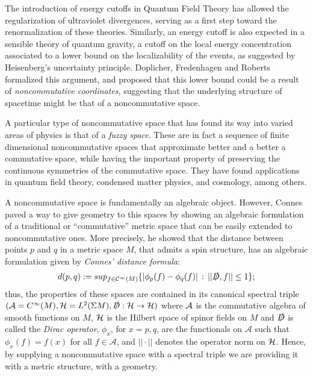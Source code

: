The introduction of energy cutoffs in Quantum Field Theory has allowed the regularization of ultraviolet divergences, serving as a first step toward the renormalization of these theories. Similarly, an energy cutoff is also expected in a sensible theory of quantum gravity, a cutoff on the local energy concentration associated to a lower bound on the localizability of the events, as suggested by Heisenberg's uncertainty principle. Doplicher, Fredenhagen and Roberts \cite{DFR} formalized this argument, and proposed that this lower bound could be a result of \textit{noncommutative coordinates}, suggesting that the underlying structure of spacetime might be that of a noncommutative space.

A particular type of noncommutative space that has found its way into varied areas of physics is that of a \emph{fuzzy space}. These are in fact a sequence of finite dimensional noncommutative spaces that approximate better and a better a commutative space, while having the important property of preserving the continuous symmetries of the commutative space. They have found applications in quantum field theory, condensed matter physics, and  cosmology, among others.

A noncommutative space is fundamentally an algebraic object. However, Connes \cite{Connes1994} paved a way to give geometry to this spaces by showing an algebraic formulation of a traditional or ``commutative'' metric space that can be easily extended to noncommutative ones. More precisely, he showed that the distance between points $p$ and $q$ in a metric space $M$, that admits a spin structure, has an algebraic formulation given by \textit{Connes' distance formula}: 
\begin{equation}
    d(p, q) := sup_{f \in \mathcal C^\infty(M)}\{ |\phi_p(f) - \phi_q(f)| \,:\,  ||\slashed D, f|| \leq 1 \};
\end{equation}
thus, the properties of these spaces are contained in its canonical spectral triple $(\mathcal A = C^\infty(M), \mathcal H = L^2(\Sigma M), \slashed D: \mathcal H \to \mathcal H)$ where $\mathcal A$ is the commutative algebra of smooth functions on $M$, $\mathcal H$ is the Hilbert space of spinor fields on $M$ and $\slashed D$ is called the \emph{Dirac operator}, $\phi_x$, for $x = p, q$, are the functionals on $\mathcal A$ such that $\phi_x(f) = f(x)$ for all $f \in \mathcal A$, and $|| \cdot ||$ denotes the operator norm on $\mathcal H$. Hence, by supplying a noncommutative space with a spectral triple we are providing it with a metric structure, with a geometry.

